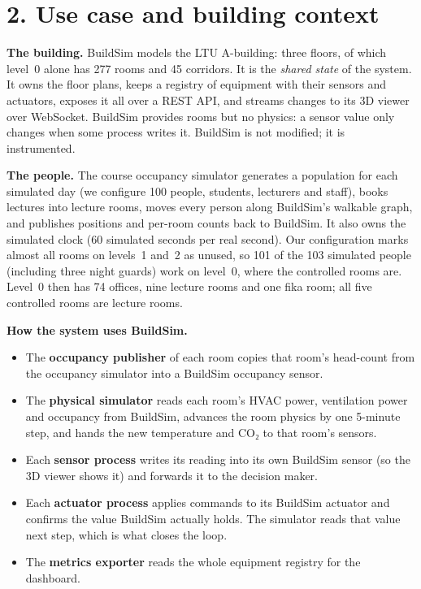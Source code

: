 \documentclass[11pt]{article}
\makeatletter
\providecommand{\tightlist}{\setlength{\itemsep}{0pt}\setlength{\parskip}{0pt}}
\DeclareRobustCommand{\_}{\ifmmode\nfss@text{\textunderscore}\else\textunderscore\allowbreak\fi}
\makeatother
\begin{document}
\section{2. Use case and building context}

\textbf{The building.} BuildSim models the LTU A-building: three floors, of
which level~0 alone has 277 rooms and 45 corridors. It is the \emph{shared state}
of the system. It
owns the floor plans, keeps a registry of equipment with their sensors and
actuators, exposes it all over a REST API, and streams changes to its 3D viewer
over WebSocket. BuildSim provides rooms but no physics: a sensor value only
changes when some process writes it. BuildSim is not modified; it is instrumented.

\textbf{The people.} The course occupancy simulator generates a population for
each simulated day (we configure 100 people, students, lecturers and staff),
books lectures into lecture rooms, moves every person along BuildSim's walkable
graph, and publishes positions and per-room counts back to BuildSim. It also owns
the simulated clock (60 simulated seconds per real second). Our configuration
marks almost all rooms on levels~1 and~2 as unused, so 101 of the 103 simulated
people (including three night guards) work on level~0, where the controlled
rooms are. Level~0 then has 74 offices, nine lecture rooms and one fika room;
all five controlled rooms are lecture rooms.

\textbf{How the system uses BuildSim.}
\begin{itemize}
\tightlist
\item The \textbf{occupancy publisher} of each room copies that room's head-count
  from the occupancy simulator into a BuildSim occupancy sensor.
\item The \textbf{physical simulator} reads each room's HVAC power, ventilation
  power and occupancy from BuildSim, advances the room physics by one 5-minute
  step, and hands the new temperature and CO₂ to that room's sensors.
\item Each \textbf{sensor process} writes its reading into its own BuildSim
  sensor (so the 3D viewer shows it) and forwards it to the decision maker.
\item Each \textbf{actuator process} applies commands to its BuildSim actuator
  and confirms the value BuildSim actually holds. The simulator reads that value
  next step, which is what closes the loop.
\item The \textbf{metrics exporter} reads the whole equipment registry for the
  dashboard.
\end{itemize}
\end{document}
